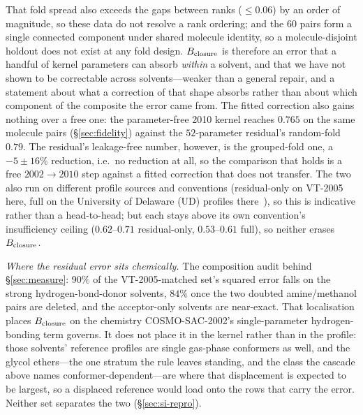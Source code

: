 That fold spread also exceeds the gaps between ranks ($\le0.06$) by an order of magnitude, so these
data do not resolve a rank ordering; and the $60$ pairs form a single connected component under
shared molecule identity, so a molecule-disjoint holdout does not exist at any fold design.
$B_{\mathrm{closure}}$ is therefore an error that a handful of kernel parameters can absorb \emph{within} a
solvent, and that we have not shown to be correctable across solvents---weaker than a
general repair, and a statement about what a correction of that shape absorbs rather than about
which component of the composite the error came from. The fitted correction also gains nothing over a free one: the parameter-free 2010
kernel reaches $0.765$ on the same molecule pairs (\S\ref{sec:fidelity}) against the
$52$-parameter residual's random-fold $0.79$. The residual's leakage-free number, however, is the
grouped-fold one, a $-5\pm16\%$ reduction, i.e.\ no reduction at all, so the comparison that holds is
a free $2002\to2010$ step against a fitted correction that does not transfer. The two also run on different
profile sources and conventions (residual-only on VT-2005 here, full on the University of Delaware
(UD) profiles there~\cite{fingerhut2017}), so this is indicative rather than a head-to-head; but each
stays above its own convention's insufficiency ceiling ($0.62$--$0.71$ residual-only, $0.53$--$0.61$
full), so neither erases $B_{\mathrm{closure}}$.

\emph{Where the residual error sits chemically.} The composition audit behind
\S\ref{sec:measure}: $90\%$ of the VT-2005-matched set's squared error falls on the strong hydrogen-bond-donor
solvents, $84\%$ once the two doubted amine/methanol pairs are deleted, and the acceptor-only
solvents are near-exact. That localisation places $B_{\mathrm{closure}}$ on the chemistry COSMO-SAC-2002's
single-parameter hydrogen-bonding term governs. It does not place it in the kernel rather than in
the profile: those solvents' reference profiles are single gas-phase conformers as well, and the
glycol ethers---the one stratum the rule leaves standing, and the class the cascade above names
conformer-dependent---are where that displacement is expected to be largest, so a displaced
reference would load onto the rows that carry the error. Neither set separates the two
(\S\ref{sec:si-repro}).

